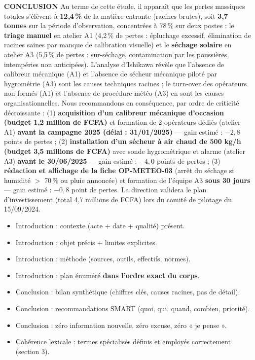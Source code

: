 \documentclass[11pt]{article}
\begin{document}
\begin{exoresolu}
\textbf{CONCLUSION}
Au terme de cette étude, il apparaît que les pertes massiques totales s'élèvent à \textbf{12,4\,\%} de la matière entrante (racines brutes), soit \textbf{3,7 tonnes} sur la période d'observation, concentrées à 78\,\% sur deux postes : le \textbf{triage manuel} en atelier A1 (4,2\,\% de pertes : épluchage excessif, élimination de racines saines par manque de calibration visuelle) et le \textbf{séchage solaire} en atelier A3 (5,5\,\% de pertes : sur-séchage, contamination par les poussières, intempéries non anticipées). L'analyse d'Ishikawa révèle que l'absence de calibreur mécanique (A1) et l'absence de sécheur mécanique piloté par hygrométrie (A3) sont les causes techniques racines ; le turn-over des opérateurs non formés (A1) et l'absence de procédure météo (A3) en sont les causes organisationnelles.
Nous recommandons en conséquence, par ordre de criticité décroissante : (1) \textbf{acquisition d'un calibreur mécanique d'occasion (budget 1,2 million de FCFA)} et formation de 2 opérateurs dédiés (atelier A1) \textbf{avant la campagne 2025 (délai : 31/01/2025)} — gain estimé : $-2,8$ points de pertes ; (2) \textbf{installation d'un sécheur à air chaud de 500 kg/h (budget 3,5 millions de FCFA)} avec sonde hygrométrique et alarme (atelier A3) \textbf{avant le 30/06/2025} — gain estimé : $-4,0$ points de pertes ; (3) \textbf{rédaction et affichage de la fiche OP-METEO-03} (arrêt du séchage si humidité $>$ 70\,\% ou pluie annoncée) et formation de l'équipe A3 \textbf{sous 30 jours} — gain estimé : $-0,8$ point de pertes. La direction validera le plan d'investissement (total 4,7 millions de FCFA) lors du comité de pilotage du 15/09/2024.
\end{exoresolu}

\begin{aretenir}
\begin{itemize}
\item Introduction : contexte (acte + date + qualité) présent.
\item Introduction : objet précis + limites explicites.
\item Introduction : méthode (sources, outils, effectifs, normes).
\item Introduction : plan énuméré \textbf{dans l'ordre exact du corps}.
\item Conclusion : bilan synthétique (chiffres clés, causes racines, pas de détail).
\item Conclusion : recommandations SMART (quoi, qui, quand, combien, priorité).
\item Conclusion : zéro information nouvelle, zéro excuse, zéro « je pense ».
\item Cohérence lexicale : termes spécialisés définis et employés correctement (section 3).
\end{itemize}
\end{aretenir}
\end{document}
